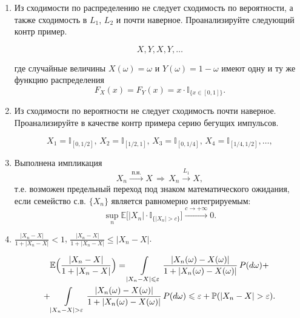 \begin{ordre}
$ $
\begin{enumerate}

\item Из сходимости по распределению не следует сходимость по вероятности, а также сходимость в $L_1$, $L_2$ и почти наверное. Проанализируйте следующий контр пример.  

\[
X,Y,X,Y,\ldots
\]

 где  случайные величины $X(\omega)=\omega$ и $Y(\omega)=1-\omega$ имеют одну и ту же функцию распределения 
$$
F_X(x)=F_Y(x)=x\cdot {\mathbb I}_{\{ x\in[0,1]\}} . 
$$

\item Из сходимости по вероятности не следует сходимость почти наверное. Проанализируйте в качестве контр примера серию бегущих импульсов.
 
$$
X_1={\mathbb I}_{[0,1/2]},\, X_2={\mathbb I}_{[1/2,1]},\, X_3={\mathbb I}_{[0,1/4]},\, X_4={\mathbb I}_{[1/4,1/2]}, \ldots, 
$$

\item Выполнена импликация 
$$
X_n\xrightarrow{\text{ п.н. }}X  \, \Rightarrow\, X_n\xrightarrow{L_1}X , 
$$
т.е. возможен предельный переход под знаком математического ожидания, если семейство с.в. $\{ X_n\}$ является равномерно интегрируемым: 
$$
\sup\limits_n {\mathbb E}\bigl[ |X_n|\cdot {\mathbb I}_{\{ |X_n|>c\}} \bigr]\xrightarrow{c\to +\infty}0 . 
$$

\item 


$\frac{|X_n-X|}{1+|X_n-X|}<1$, $\frac{|X_n-X|}{1+|X_n-X|}\leqslant |X_n-X|$. 


\begin{multline*}
{\mathbb E}\Bigl( \frac{|X_n-X|}{1+|X_n-X|}\Bigr)=\int\limits_{|X_n-X|\leqslant\varepsilon} 
\frac{|X_n(\omega)-X(\omega)|}{1+|X_n(\omega)-X(\omega)|}\, P(d\omega)+\\
+\int\limits_{|X_n-X|>\varepsilon}
\frac{|X_n(\omega)-X(\omega)|}{1+|X_n(\omega)-X(\omega)|}\, P(d\omega)
\leqslant \varepsilon+{\mathbb P}(|X_n-X|>\varepsilon) . 
\end{multline*}

\end{enumerate}

\end{ordre}
